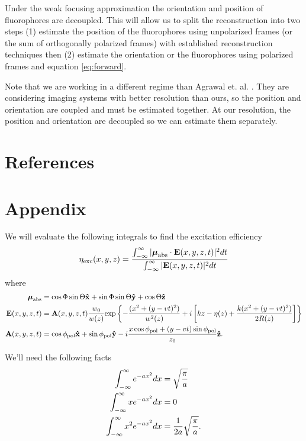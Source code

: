 \documentclass[11pt]{article}
\begin{document}
Under the weak focusing approximation the orientation and position of
fluorophores are decoupled. This will allow us to split the reconstruction into
two steps (1) estimate the position of the fluorophores using unpolarized frames
(or the sum of orthogonally polarized frames) with established reconstruction
techniques then (2) estimate the orientation or the fluorophores using polarized
frames and equation \ref{eq:forward}.

Note that we are working in a different regime than Agrawal et. al. \cite{agrawal}. They
are considering imaging systems with better resolution than ours, so the
position and orientation are coupled and must be estimated together. At our
resolution, the position and orientation are decoupled so we can estimate them
separately.

\section{References}
\setlength{}
\printbibliography[heading=none]
\pagebreak

\section{Appendix}
We will evaluate the following integrals to find the excitation efficiency
\begin{align}
  \eta_{\text{exc}}(x,y,z) = \frac{\int_{-\infty}^{\infty}|\boldsymbol{\mu}_{\text{abs}} \cdot \mathbf{E}(x,y,z,t)|^2dt}{\int_{-\infty}^{\infty}|\mathbf{E}(x,y,z,t)|^2dt}\label{eq:excitation}
\end{align}
where
\begin{align}
  \boldsymbol{\mu}_{\text{abs}} &= \cos\Phi\sin\Theta\mathbf{\hat{x}} + \sin\Phi\sin\Theta\mathbf{\hat{y}} + \cos\Theta\mathbf{\hat{z}}\\
  \mathbf{E}(x,y,z,t) &= \mathbf{A}(x,y,z,t)\frac{w_0}{w(z)}\text{exp}\left\{{-\frac{(x^2+(y-vt)^2)}{w^2(z)}}+i\left[kz - \eta(z) + \frac{k(x^2+(y-vt)^2)}{2R(z)}\right]\right\}\\
  \mathbf{A}(x,y,z,t) &= \cos\phi_{\text{pol}}\mathbf{\hat{x}} + \sin\phi_{\text{pol}}\mathbf{\hat{y}} - i\frac{x\cos\phi_{\text{pol}} + (y - vt)\sin\phi_{\text{pol}}}{z_0}\mathbf{\hat{z}}.\label{eq:scanned_jones}
\end{align}

We'll need the following facts
\begin{align}
  \int_{-\infty}^{\infty} e^{-ax^2}dx &= \sqrt{\frac{\pi}{a}}\\
  \int_{-\infty}^{\infty} xe^{-ax^2}dx &= 0 \label{eq:odd}\\ 
  \int_{-\infty}^{\infty} x^2e^{-ax^2}dx &= \frac{1}{2a}\sqrt{\frac{\pi}{a}}.
\end{align}
\end{document}
